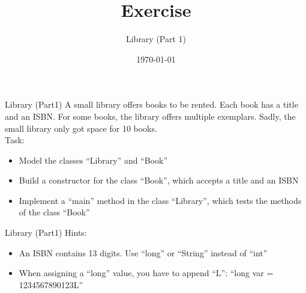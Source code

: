 


\title{Exercise}
\subtitle{Library (Part 1)}
\date{\today}




\begin{frame}
    \titlepage
\end{frame}

\begin{frame}{Library (Part1)}
    A small library offers books to be rented. Each book has a title and an ISBN. For some books, the library offers multiple exemplars. Sadly, the small library only got space for 10 books.\\
    Task:
    \begin{itemize}
        \item Model the classes ``Library'' and ``Book''
        \item Build a constructor for the class ``Book'', which accepts a title and an ISBN
        \item Implement a ``main'' method in the class ``Library'', which tests the methods of the class ``Book''
    \end{itemize}
\end{frame}

\begin{frame}{Library (Part1)}
    Hints:
    \begin{itemize}
        \item An ISBN contains 13 digits. Use ``long'' or ``String'' instead of ``int''
        \item When assigning a ``long'' value, you have to append ``L'': ``long var = 1234567890123L''
    \end{itemize}
\end{frame}



